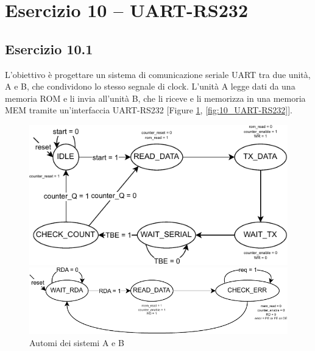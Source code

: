 \section{Esercizio 10 -- UART-RS232}
\subsection{Esercizio 10.1}
L'obiettivo è progettare un sistema di comunicazione seriale UART tra due unità, A e B, che condividono lo stesso segnale di clock. L'unità A legge dati da una memoria ROM e li invia all'unità B, che li riceve e li memorizza in una memoria MEM tramite un'interfaccia UART-RS232 [Figure \ref{fig:uart}, \ref{fig:10_UART-RS232}].

\begin{figure}[h]
    \centering
    \begin{minipage}[c]{0.45\linewidth}
        \includegraphics[width=\linewidth]{img/uart_A.pdf}
    \end{minipage}
    \hfill
    \begin{minipage}[c]{0.45\linewidth}
        \includegraphics[width=\linewidth]{img/uart_B.pdf}
    \end{minipage}
    \caption{Automi dei sistemi A e B}
    \label{fig:uart}
\end{figure}

